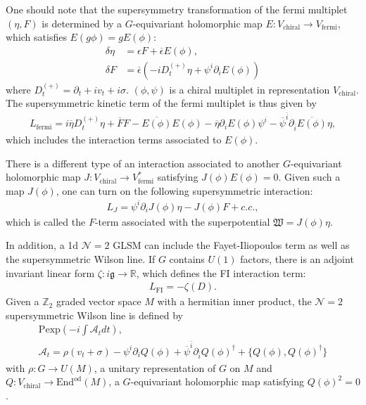 \documentclass[a4paper,11pt]{article}
\begin{document}
One should note that the supersymmetry transformation of the fermi multiplet $(\eta,F)$ is determined by a $G$-equivariant holomorphic map $E:V_\text{chiral} \rightarrow V_\text{fermi}$, which satisfies $E(g \phi) = g E(\phi)$:
\begin{align}
\delta \eta &= \epsilon F+\overline \epsilon E(\phi), \\
\delta F &= \overline \epsilon \left(-i D_t^{(+)} \eta+\psi^i \partial_i E(\phi) \right)
\end{align}
where $D_t^{(+)} = \partial_t+i v_t+i \sigma$. $(\phi,\psi)$ is a chiral multiplet in representation $V_\text{chiral}$. The supersymmetric kinetic term of the fermi multiplet is thus given by
\begin{align}
L_\text{fermi} = i \overline \eta D_t^{(+)} \eta+\overline F F-\overline{E(\phi)} E(\phi)-\overline \eta \partial_i E(\phi) \psi^i-\overline \psi^{\bar i} \partial_{\bar i} \overline{E(\phi)} \eta,
\end{align}
which includes the interaction terms associated to $E(\phi)$.

There is a different type of an interaction associated to another $G$-equivariant holomorphic map $J:V_\text{chiral} \rightarrow V_\text{fermi}^*$ satisfying $J(\phi) E(\phi) = 0$. Given such a map $J(\phi)$, one can turn on the following supersymmetric interaction:
\begin{align}
L_J = \psi^i \partial_i J(\phi) \eta-J(\phi) F+c.c.,
\end{align}
which is called the $F$-term associated with the superpotential $\mathfrak W = J(\phi) \eta$.

In addition, a 1d $\mathcal N = 2$ GLSM can include the Fayet-Iliopoulos term as well as the supersymmetric Wilson line. If $G$ contains $U(1)$ factors, there is an adjoint invariant linear form $\zeta: i \mathfrak g \rightarrow \mathbb R$, which defines the FI interaction term:
\begin{align}
L_\text{FI} = -\zeta(D).
\end{align}
Given a $\mathbb Z_2$ graded vector space $M$ with a hermitian inner product, the $\mathcal N = 2$ supersymmetric Wilson line is defined by
\begin{gather}
\mathrm{P exp} \left(-i \int \mathcal A_t dt\right), \\
\mathcal A_t = \rho(v_t+\sigma)-\psi^i \partial_i Q(\phi)+\overline \psi^{\bar i} \partial_{\bar i} Q(\phi)^\dagger+\{Q(\phi),Q(\phi)^\dagger\}
\end{gather}
with $\rho:G \rightarrow U(M)$, a unitary representation of $G$ on $M$ and $Q:V_\text{chiral} \rightarrow \mathrm{End}^\text{od} (M)$, a $G$-equivariant holomorphic map satisfying $Q(\phi)^2 = 0$.
\end{document}
